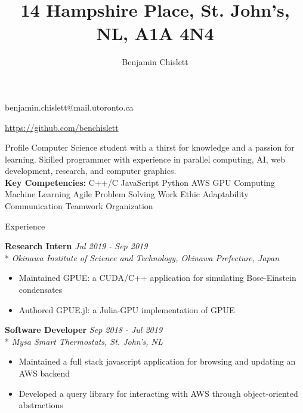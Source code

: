 \documentclass[11pt, letterpaper]{article}
\title{14 Hampshire Place, St. John's, NL, A1A 4N4}
\author{Benjamin Chislett}
\date{}
\newcommand{\vbar}{\textbar\xspace}
\begin{document}
\begin{center}
  \Huge\theauthor
  \par
  \large\thetitle
  \par
  \large{benjamin.chislett@mail.utoronto.ca}
  \par
  \large\url{https://github.com/benchislett}
\end{center}

\begin{section}{Profile}
Computer Science student with a thirst for knowledge and a passion for learning.
Skilled programmer with experience in parallel computing, AI, web development, research, and computer graphics.
\\

\textbf{Key Competencies:} C++/C \vbar JavaScript \vbar Python \vbar AWS \vbar GPU Computing \vbar Machine Learning  Agile \vbar Problem Solving \vbar Work Ethic \vbar Adaptability \vbar Communication \vbar Teamwork \vbar Organization

\end{section}

\begin{section}{Experience}

\textbf{Research Intern}
\hfill
\textit{Jul 2019 - Sep 2019}\\*
\textit{Okinawa Institute of Science and Technology, Okinawa Prefecture, Japan}

\begin{itemize}
  \item Maintained GPUE: a CUDA/C++ application for simulating Bose-Einstein condensates
  \item Authored GPUE.jl: a Julia-GPU implementation of GPUE\\
\end{itemize}

\textbf{Software Developer}
\hfill
\textit{Sep 2018 - Jul 2019}\\*
\textit{Mysa Smart Thermostats, St. John's, NL}
\begin{itemize}
  \item Maintained a full stack javascript application for browsing and updating an AWS backend
  \item Developed a query library for interacting with AWS through object-oriented abstractions
\end{itemize}

\end{section}
\end{document}
